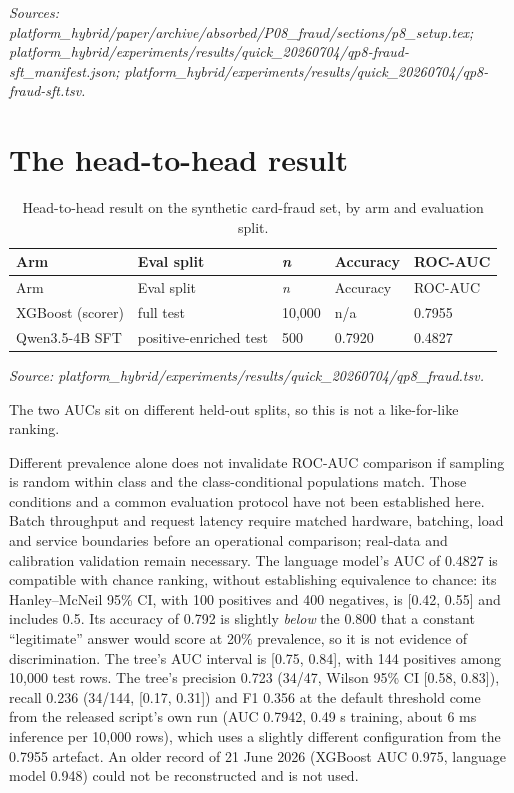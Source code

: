 \documentclass[12pt,a4paper]{report}
\begin{document}
\emph{Sources:
platform\_hybrid/paper/archive/absorbed/P08\_fraud/sections/p8\_setup.tex;
platform\_hybrid/experiments/results/quick\_20260704/qp8-fraud-sft\_manifest.json;
platform\_hybrid/experiments/results/quick\_20260704/qp8-fraud-sft.tsv.}

\section{The head-to-head result}\label{the-head-to-head-result}

\begin{longtable}[]{@{}lllll@{}}
\caption{Head-to-head result on the synthetic card-fraud set, by arm and
evaluation split.}\tabularnewline
\toprule\noalign{}
Arm & Eval split & \emph{n} & Accuracy & ROC-AUC \\
\midrule\noalign{}
\endfirsthead
\toprule\noalign{}
Arm & Eval split & \emph{n} & Accuracy & ROC-AUC \\
\midrule\noalign{}
\endhead
\bottomrule\noalign{}
\endlastfoot
XGBoost (scorer) & full test & 10,000 & n/a & 0.7955 \\
Qwen3.5-4B SFT & positive-enriched test & 500 & 0.7920 & 0.4827 \\
\end{longtable}

\emph{Source:
platform\_hybrid/experiments/results/quick\_20260704/qp8\_fraud.tsv.}

The two AUCs sit on different held-out splits, so this is not a
like-for-like ranking.

Different prevalence alone does not invalidate ROC-AUC comparison if
sampling is random within class and the class-conditional populations
match. Those conditions and a common evaluation protocol have not been
established here. Batch throughput and request latency require matched
hardware, batching, load and service boundaries before an operational
comparison; real-data and calibration validation remain necessary. The
language model's AUC of 0.4827 is compatible with chance ranking,
without establishing equivalence to chance: its Hanley--McNeil 95\% CI,
with 100 positives and 400 negatives, is {[}0.42, 0.55{]} and includes
0.5. Its accuracy of 0.792 is slightly \emph{below} the 0.800 that a
constant ``legitimate'' answer would score at 20\% prevalence, so it is
not evidence of discrimination. The tree's AUC interval is {[}0.75,
0.84{]}, with 144 positives among 10,000 test rows. The tree's precision
0.723 (34/47, Wilson 95\% CI {[}0.58, 0.83{]}), recall 0.236 (34/144,
{[}0.17, 0.31{]}) and F1 0.356 at the default threshold come from the
released script's own run (AUC 0.7942, 0.49 s training, about 6 ms
inference per 10,000 rows), which uses a slightly different
configuration from the 0.7955 artefact. An older record of 21 June 2026
(XGBoost AUC 0.975, language model 0.948) could not be reconstructed and
is not used.
\end{document}
